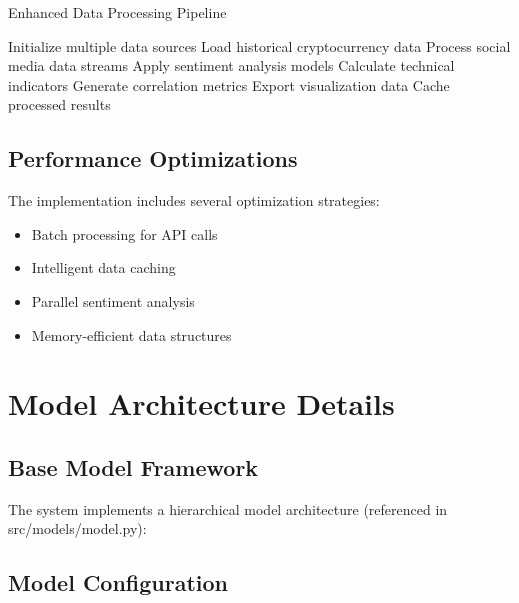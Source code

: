 \documentclass[12pt,a4paper]{report}
\begin{document}
\begin{algorithm}
    \caption{Enhanced Data Processing Pipeline}
    \begin{algorithmic}[1]
        \State Initialize multiple data sources
        \State Load historical cryptocurrency data
        \State Process social media data streams
        \State Apply sentiment analysis models
        \State Calculate technical indicators
        \State Generate correlation metrics
        \State Export visualization data
        \State Cache processed results
    \end{algorithmic}
\end{algorithm}

\section{Performance Optimizations}
The implementation includes several optimization strategies:
\begin{itemize}
    \item Batch processing for API calls
    \item Intelligent data caching
    \item Parallel sentiment analysis
    \item Memory-efficient data structures
\end{itemize}

\chapter{Model Architecture Details}
\section{Base Model Framework}
The system implements a hierarchical model architecture (referenced in src/models/model.py):

\section{Model Configuration}
\end{document}
